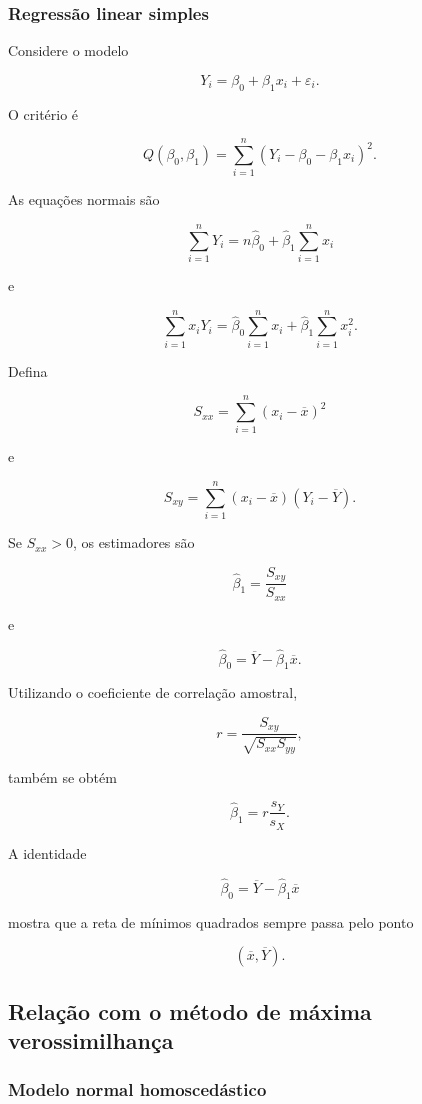 \documentclass[
  letterpaper,
  DIV=11,
  numbers=noendperiod]{scrreprt}
\begin{document}
\subsubsection{Regressão linear
simples}\label{regressuxe3o-linear-simples}

Considere o modelo

\[Y_i
=
\beta_0+\beta_1x_i+\varepsilon_i.\]

O critério é

\[Q(\beta_0,\beta_1)
=
\sum_{i=1}^n
(Y_i-\beta_0-\beta_1x_i)^2.\]

As equações normais são

\[\sum_{i=1}^nY_i
=
n\widehat\beta_0
+
\widehat\beta_1
\sum_{i=1}^nx_i\]

e

\[\sum_{i=1}^nx_iY_i
=
\widehat\beta_0
\sum_{i=1}^nx_i
+
\widehat\beta_1
\sum_{i=1}^nx_i^2.\]

Defina

\[S_{xx}
=
\sum_{i=1}^n
(x_i-\overline x)^2\]

e

\[S_{xy}
=
\sum_{i=1}^n
(x_i-\overline x)(Y_i-\overline Y).\]

Se \(S_{xx}>0\), os estimadores são

\[\boxed{
\widehat\beta_1
=
\frac{S_{xy}}{S_{xx}}
}\]

e

\[\boxed{
\widehat\beta_0
=
\overline Y-\widehat\beta_1\overline x
}.\]

Utilizando o coeficiente de correlação amostral,

\[r
=
\frac{S_{xy}}
{\sqrt{S_{xx}S_{yy}}},\]

também se obtém

\[\widehat\beta_1
=
r\frac{s_Y}{s_X}.\]

A identidade

\[\widehat\beta_0
=
\overline Y-\widehat\beta_1\overline x\]

mostra que a reta de mínimos quadrados sempre passa pelo ponto

\[(\overline x,\overline Y).\]

\subsection{Relação com o método de máxima
verossimilhança}\label{relauxe7uxe3o-com-o-muxe9todo-de-muxe1xima-verossimilhanuxe7a}

\subsubsection{Modelo normal
homoscedástico}\label{modelo-normal-homosceduxe1stico}
\end{document}
